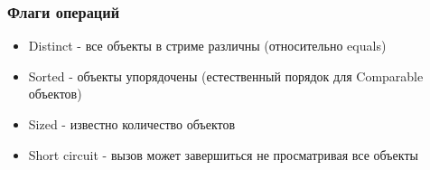 \begin{frame}
\frametitle{Флаги операций} %
\begin{itemize}
	\item Distinct - все объекты в стриме различны (относительно equals)
	\item Sorted - объекты упорядочены (естественный порядок для Comparable объектов)
	\item Sized - известно количество объектов
	\item Short circuit - вызов может завершиться не просматривая все объекты
\end{itemize}
\end{frame}